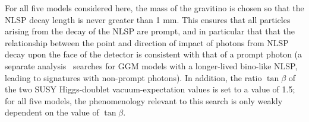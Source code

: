 For all five
models considered here, the mass of the gravitino is chosen so that
the NLSP decay length is never greater than 1 mm. This ensures that all
particles arising from the decay of the NLSP are prompt, and in particular that
that the relationship between the point and direction of impact
of photons from NLSP decay upon the face of the detector is
consistent with that of a prompt photon (a separate analysis~\cite{Aad:2014gfa}
searches for GGM models with a longer-lived bino-like NLSP, leading to signatures with non-prompt photons).
In addition, the ratio
$\tan \beta$ of the two SUSY Higgs-doublet vacuum-expectation values is set to a value of 1.5;
for all five
models, the
phenomenology relevant to this search is only
weakly dependent on the value of $\tan \beta$.
